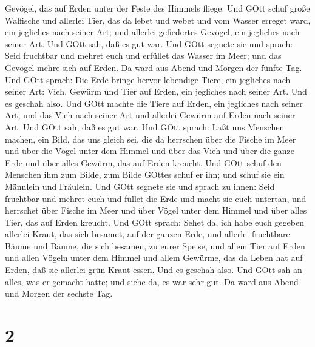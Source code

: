 Gevögel, das auf Erden unter der Feste des Himmels fliege. 
Und GOtt schuf große Walfische und allerlei Tier, das da lebet und webet
und vom Wasser erreget ward, ein jegliches nach seiner Art; und allerlei
gefiedertes Gevögel, ein jegliches nach seiner Art. Und GOtt sah, daß es
gut war.  Und GOtt segnete sie und sprach: Seid fruchtbar
und mehret euch und erfüllet das Wasser im Meer; und das Gevögel mehre
sich auf Erden.  Da ward aus Abend und Morgen der fünfte
Tag.  Und GOtt sprach: Die Erde bringe hervor lebendige
Tiere, ein jegliches nach seiner Art: Vieh, Gewürm und Tier auf Erden,
ein jegliches nach seiner Art. Und es geschah also.  Und
GOtt machte die Tiere auf Erden, ein jegliches nach seiner Art, und das
Vieh nach seiner Art und allerlei Gewürm auf Erden nach seiner Art. Und
GOtt sah, daß es gut war.  Und GOtt sprach: Laßt uns
Menschen machen, ein Bild, das uns gleich sei, die da herrschen über die
Fische im Meer und über die Vögel unter dem Himmel und über das Vieh und
über die ganze Erde und über alles Gewürm, das auf Erden kreucht.
 Und GOtt schuf den Menschen ihm zum Bilde, zum Bilde
GOttes schuf er ihn; und schuf sie ein Männlein und Fräulein.
 Und GOtt segnete sie und sprach zu ihnen: Seid fruchtbar
und mehret euch und füllet die Erde und macht sie euch untertan, und
herrschet über Fische im Meer und über Vögel unter dem Himmel und über
alles Tier, das auf Erden kreucht.  Und GOtt sprach: Sehet
da, ich habe euch gegeben allerlei Kraut, das sich besamet, auf der
ganzen Erde, und allerlei fruchtbare Bäume und Bäume, die sich besamen,
zu eurer Speise,  und allem Tier auf Erden und allen Vögeln
unter dem Himmel und allem Gewürme, das da Leben hat auf Erden, daß sie
allerlei grün Kraut essen. Und es geschah also.  Und GOtt
sah an alles, was er gemacht hatte; und siehe da, es war sehr gut. Da
ward aus Abend und Morgen der sechste Tag.

\hypertarget{section-1}{%
\section{2}\label{section-1}}

